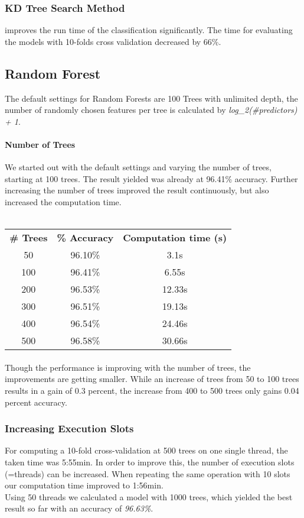 \documentclass{article}
\begin{document}
\subsubsection{KD Tree Search Method} improves the run time of the classification significantly. The time for evaluating the models with 10-folds cross validation decreased by 66\%. 

\subsection{Random Forest}
The default settings for Random Forests are 100 Trees with unlimited depth, the number of randomly chosen features per tree is calculated by \textit{log\_2(\#predictors) + 1}.
\paragraph{Number of Trees} We started out with the default settings and varying the number of trees, starting at 100 trees. The result yielded was already at 96.41\% accuracy. Further increasing the number of trees improved the result continuously, but also increased the computation time. 
\\\\
\begin{center}
\begin{tabular}{ c | c | c }
\textbf{\# Trees} & \textbf{\% Accuracy} & \textbf{Computation time (s)} \\
50 & 96.10\% & 3.1s \\
100 & 96.41\% & 6.55s \\
200 & 96.53\% & 12.33s \\
300 & 96.51\% & 19.13s \\
400 & 96.54\% & 24.46s \\
500 & 96.58\% & 30.66s\\
\end{tabular}
\end{center}

\paragraph{}Though the performance is improving with the number of trees, the improvements are getting smaller. While an increase of trees from 50 to 100 trees results in a gain of 0.3 percent, the increase from 400 to 500 trees only gains 0.04 percent accuracy. 
\subsubsection{Increasing Execution Slots}For computing a 10-fold cross-validation at 500 trees on one single thread, the taken time was 5:55min. In order to improve this, the number of execution slots (=threads) can be increased. When repeating the same operation with 10 slots our computation time improved to 1:56min. \\
Using 50 threads we calculated a model with 1000 trees, which yielded the best result so far with an accuracy of \emph{96.63\%}. 
\end{document}
